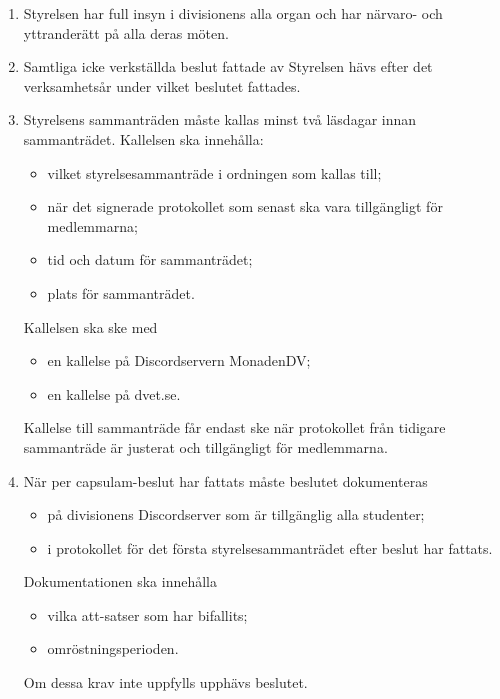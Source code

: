 \documentclass{dvd}
\begin{document}
\begin{enumerate}[label=\arabic* §, ref=\arabic*]
		Protokoll från styrelsemöten ska vara tillgängliga för medlemmarna senast 10 läsdagar efter mötets avslut.

		Det senaste signerade protokollet ska direktlänkas i divisionens Discordserver så fort den finns tillgängligt.

		\item Styrelsen har full insyn i divisionens alla organ och har närvaro- och yttranderätt på alla deras möten.

        \item Samtliga icke verkställda beslut fattade av Styrelsen hävs efter det verksamhetsår under vilket beslutet fattades.

		\item Styrelsens sammanträden måste kallas minst två läsdagar innan sammanträdet. Kallelsen ska innehålla:

		\begin{itemize}
			\item vilket styrelsesammanträde i ordningen som kallas till;
			\item när det signerade protokollet som senast ska vara tillgängligt för medlemmarna;
			\item tid och datum för sammanträdet;
			\item plats för sammanträdet.
		\end{itemize}

		Kallelsen ska ske med
		
		\begin{itemize}
			\item en kallelse på Discordservern MonadenDV;
			\item en kallelse på dvet.se.
		\end{itemize}
		
		Kallelse till sammanträde får endast ske när protokollet från tidigare sammanträde är justerat och tillgängligt för medlemmarna.

		\item När per capsulam-beslut har fattats måste beslutet dokumenteras
		
		\begin{itemize}
			\item på divisionens Discordserver som är tillgänglig alla studenter;
			\item i protokollet för det första styrelsesammanträdet efter beslut har fattats.
		\end{itemize}
		
		Dokumentationen ska innehålla
		
		\begin{itemize}
			\item vilka att-satser som har bifallits;
			\item omröstningsperioden.
		\end{itemize}
		
		Om dessa krav inte uppfylls upphävs beslutet.


	\end{enumerate}
\end{document}
